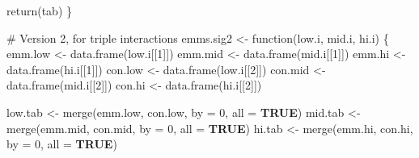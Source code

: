 \documentclass[
  bookmarksnumbered]{article}
\newenvironment{Shaded}{\begin{snugshade}}{\end{snugshade}}
\newcommand{\AttributeTok}[1]{\textcolor[rgb]{0.80,0.80,0.80}{#1}}
\newcommand{\CommentTok}[1]{\textcolor[rgb]{0.50,0.62,0.50}{#1}}
\newcommand{\ConstantTok}[1]{\textcolor[rgb]{0.86,0.64,0.64}{\textbf{#1}}}
\newcommand{\ControlFlowTok}[1]{\textcolor[rgb]{0.94,0.87,0.69}{#1}}
\newcommand{\DecValTok}[1]{\textcolor[rgb]{0.86,0.86,0.80}{#1}}
\newcommand{\FunctionTok}[1]{\textcolor[rgb]{0.94,0.94,0.56}{#1}}
\newcommand{\NormalTok}[1]{\textcolor[rgb]{0.80,0.80,0.80}{#1}}
\newcommand{\OtherTok}[1]{\textcolor[rgb]{0.94,0.94,0.56}{#1}}
\begin{document}
\begin{Shaded}
\begin{Highlighting}[]
  \FunctionTok{return}\NormalTok{(tab)}
\NormalTok{\}}

\CommentTok{\# Version 2, for triple interactions}
\NormalTok{emms.sig2 }\OtherTok{\textless{}{-}} \ControlFlowTok{function}\NormalTok{(low.i, mid.i, hi.i) \{}
\NormalTok{  emm.low }\OtherTok{\textless{}{-}} \FunctionTok{data.frame}\NormalTok{(low.i[[}\DecValTok{1}\NormalTok{]])}
\NormalTok{  emm.mid }\OtherTok{\textless{}{-}} \FunctionTok{data.frame}\NormalTok{(mid.i[[}\DecValTok{1}\NormalTok{]])}
\NormalTok{  emm.hi }\OtherTok{\textless{}{-}} \FunctionTok{data.frame}\NormalTok{(hi.i[[}\DecValTok{1}\NormalTok{]])}
\NormalTok{  con.low }\OtherTok{\textless{}{-}} \FunctionTok{data.frame}\NormalTok{(low.i[[}\DecValTok{2}\NormalTok{]])}
\NormalTok{  con.mid }\OtherTok{\textless{}{-}} \FunctionTok{data.frame}\NormalTok{(mid.i[[}\DecValTok{2}\NormalTok{]])}
\NormalTok{  con.hi }\OtherTok{\textless{}{-}} \FunctionTok{data.frame}\NormalTok{(hi.i[[}\DecValTok{2}\NormalTok{]]) }
  
\NormalTok{  low.tab }\OtherTok{\textless{}{-}} \FunctionTok{merge}\NormalTok{(emm.low, con.low, }\AttributeTok{by =} \DecValTok{0}\NormalTok{, }\AttributeTok{all =} \ConstantTok{TRUE}\NormalTok{)}
\NormalTok{  mid.tab }\OtherTok{\textless{}{-}} \FunctionTok{merge}\NormalTok{(emm.mid, con.mid, }\AttributeTok{by =} \DecValTok{0}\NormalTok{, }\AttributeTok{all =} \ConstantTok{TRUE}\NormalTok{)}
\NormalTok{  hi.tab }\OtherTok{\textless{}{-}} \FunctionTok{merge}\NormalTok{(emm.hi, con.hi, }\AttributeTok{by =} \DecValTok{0}\NormalTok{, }\AttributeTok{all =} \ConstantTok{TRUE}\NormalTok{)}
  

\end{Highlighting}
\end{Shaded}
\end{document}

